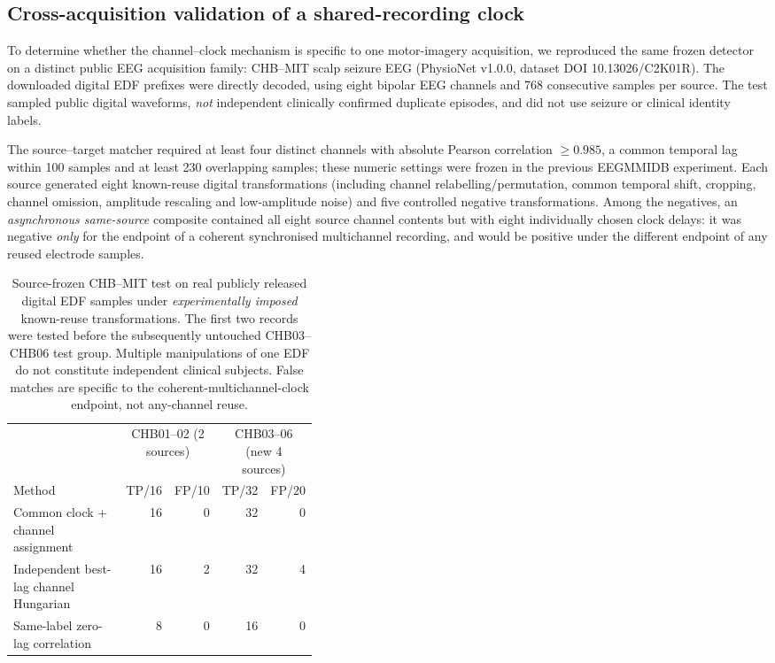 \subsection{Cross-acquisition validation of a shared-recording clock}
\label{sec:p2-physionet-external-clock}
To determine whether the channel--clock mechanism is specific to one
motor-imagery acquisition, we reproduced the same frozen detector on
a distinct public EEG acquisition family: CHB--MIT scalp seizure EEG
(PhysioNet v1.0.0, dataset DOI 10.13026/C2K01R). The downloaded
digital EDF prefixes were directly decoded, using eight bipolar EEG
channels and 768 consecutive samples per source. The test sampled
public digital waveforms, \emph{not} independent clinically confirmed
duplicate episodes, and did not use seizure or clinical identity labels.

The source--target matcher required at least four distinct channels
with absolute Pearson correlation $\ge0.985$, a common temporal lag
within 100 samples and at least 230 overlapping samples; these numeric
settings were frozen in the previous EEGMMIDB experiment. Each
source generated eight known-reuse digital transformations (including
channel relabelling/permutation, common temporal shift, cropping,
channel omission, amplitude rescaling and low-amplitude noise) and
five controlled negative transformations. Among the negatives, an
\emph{asynchronous same-source} composite contained all eight source
channel contents but with eight individually chosen clock delays:
it was negative \emph{only} for the endpoint of a coherent
synchronised multichannel recording, and would be positive under
the different endpoint of any reused electrode samples.

\begin{table}[tb]
\centering\small
\caption{Source-frozen CHB--MIT test on real publicly released
digital EDF samples under \emph{experimentally imposed}
known-reuse transformations. The first two records were tested
before the subsequently untouched CHB03--CHB06 test group.
Multiple manipulations of one EDF do not constitute independent
clinical subjects. False matches are specific to the
coherent-multichannel-clock endpoint, not any-channel reuse.}
\label{tab:p2-chbmit-external-clock}
\setlength{\tabcolsep}{3pt}
\begin{tabular}{@{}p{0.40\linewidth}rrrr@{}}
\toprule
&\multicolumn{2}{c}{CHB01--02 (2 sources)}
&\multicolumn{2}{c}{CHB03--06 (new 4 sources)}\\
Method & TP/16 & FP/10 & TP/32 & FP/20\\
\midrule
Common clock + channel assignment &16&0&32&0\\
Independent best-lag channel Hungarian &16&2&32&4\\
Same-label zero-lag correlation &8&0&16&0\\
\bottomrule
\end{tabular}
\end{table}

